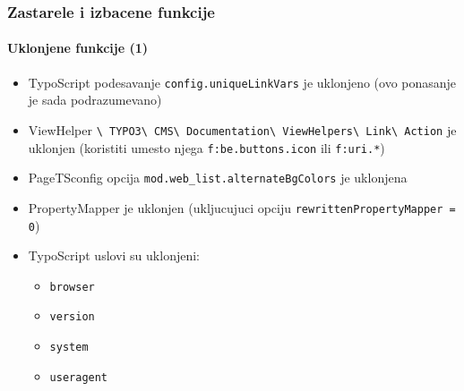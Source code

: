 \begin{frame}[fragile]
	\frametitle{Zastarele i izbacene funkcije}
	\framesubtitle{Uklonjene funkcije (1)}

	\begin{itemize}

		\item
			\small
				TypoScript podesavanje \texttt{config.uniqueLinkVars} je uklonjeno\newline
				(ovo ponasanje je sada podrazumevano)
			\normalsize

		\item
			\small
				ViewHelper
					\texttt{\textbackslash
						TYPO3\textbackslash
						CMS\textbackslash
						Documentation\textbackslash
						ViewHelpers\textbackslash
						Link\textbackslash
						Action}
					je uklonjen (koristiti umesto njega \texttt{f:be.buttons.icon} ili \texttt{f:uri.*})
			\normalsize

		\item
			\small
				PageTSconfig opcija \texttt{mod.web\_list.alternateBgColors}\newline
				je uklonjena
			\normalsize

		\item
			\small
				PropertyMapper je uklonjen\newline
				(ukljucujuci opciju \texttt{rewrittenPropertyMapper = 0})
			\normalsize

		\item
			\small
				TypoScript uslovi su uklonjeni:

					\begin{itemize}
						\item\texttt{browser}
						\item\texttt{version}
						\item\texttt{system}
						\item\texttt{useragent}
					\end{itemize}
			\normalsize

	\end{itemize}

\end{frame}


